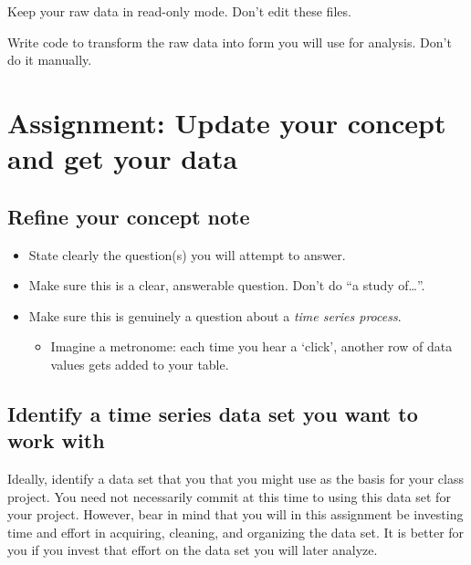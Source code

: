 \documentclass[
]{book}
\providecommand{\tightlist}{%
  \setlength{\itemsep}{0pt}\setlength{\parskip}{0pt}}
\begin{document}
Keep your raw data in read-only mode. Don't edit these files.

Write code to transform the raw data into form you will use for analysis. Don't do it manually.

\hypertarget{assignment-update-your-concept-and-get-your-data}{%
\chapter{Assignment: Update your concept and get your data}\label{assignment-update-your-concept-and-get-your-data}}

\hypertarget{refine-your-concept-note}{%
\section{Refine your concept note}\label{refine-your-concept-note}}

\begin{itemize}
\tightlist
\item
  State clearly the question(s) you will attempt to answer.
\item
  Make sure this is a clear, answerable question. Don't do ``a study of\ldots{}''.
\item
  Make sure this is genuinely a question about a \emph{time series process}.

  \begin{itemize}
  \tightlist
  \item
    Imagine a metronome: each time you hear a `click', another row of data values gets added to your table.
  \end{itemize}
\end{itemize}

\hypertarget{identify-a-time-series-data-set-you-want-to-work-with}{%
\section{Identify a time series data set you want to work with}\label{identify-a-time-series-data-set-you-want-to-work-with}}

Ideally, identify a data set that you that you might use as the basis for your class project. You need not necessarily commit at this time to using this data set for your project. However, bear in mind that you will in this assignment be investing time and effort in acquiring, cleaning, and organizing the data set. It is better for you if you invest that effort on the data set you will later analyze.
\end{document}
